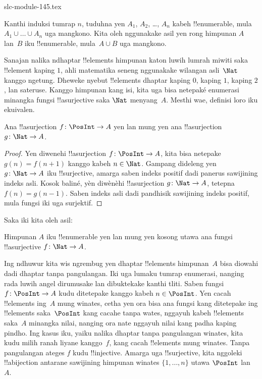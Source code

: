 \begin{filecontents*}[overwrite]{slc-module-145.tex}
\begin{prob}
  Kanthi induksi tumrap $n$, tuduhna yen $A_1$, $A_2$, \dots, $A_n$ kabeh
  !!{enumerable}, mula $A_1 \cup \dots \cup A_n$ uga mangkono. Kita oleh nggunakake
  asil yen rong himpunan $A$ lan~$B$ iku !!{enumerable}, mula~$A \cup
  B$ uga mangkono.
\end{prob}

Sanajan nalika ndhaptar !!{element}s himpunan katon luwih lumrah
miwiti saka !!{element} kaping $1$, ahli matematika seneng
nggunakake wilangan asli~$\Nat$ kanggo ngetung.
Dheweke nyebut !!{element}s dhaptar kaping $0$, kaping $1$, kaping $2$, lan sateruse.
Kanggo himpunan kang isi, kita uga bisa netepaké enumerasi minangka
fungsi !!a{surjective} saka $\Nat$ menyang~$A$.
Mesthi wae, definisi loro iku ekuivalen.

\begin{prop}
  Ana !!a{surjection} $f\colon \PosInt \to A$ yen lan mung yen ana
  !!a{surjection} $g\colon \Nat \to A$.
\end{prop}

\begin{proof}
  Yen diwenehi !!a{surjection} $f\colon \PosInt \to A$, kita bisa netepake $g(n) =
  f(n+1)$ kanggo kabeh $n \in \Nat$. Gampang dideleng yen $g\colon \Nat
  \to A$ iku !!{surjective}, amarga saben indeks positif dadi panerus
  sawijining indeks asli. Kosok baliné, yèn diwènèhi !!a{surjection} $g\colon
  \Nat \to A$, tetepna $f(n) = g(n-1)$. Saben indeks asli dadi
  pandhisik sawijining indeks positif, mula fungsi iki uga surjektif.
\end{proof}

Saka iki kita oleh asil:

\begin{cor}
Himpunan $A$ iku !!{enumerable} yen lan mung yen kosong utawa ana
fungsi !!a{surjective} $f\colon \Nat \to A$.
\end{cor}

Ing ndhuwur kita wis ngrembug yen dhaptar !!{element}s himpunan~$A$ bisa
diowahi dadi dhaptar tanpa pangulangan. Iki uga lumaku tumrap
enumerasi, nanging rada luwih angel dirumusake lan dibuktekake kanthi tliti.
Saben fungsi $f\colon \PosInt \to A$ kudu ditetepake kanggo kabeh $n \in
\PosInt$. Yen cacah !!{element}s ing~$A$ mung winates, cetha yen ora bisa
ana fungsi kang ditetepake ing !!{element}s saka~$\PosInt$ kang cacahe tanpa wates,
nggayuh kabeh !!{element}s saka~$A$ minangka nilai, nanging ora nate
nggayuh nilai kang padha kaping pindho. Ing kasus iku, yaiku
nalika dhaptar tanpa pangulangan winates, kita kudu milih ranah
liyane kanggo~$f$, kang cacah !!{element}s mung winates.
Tanpa pangulangan ateges $f$ kudu !!{injective}. Amarga uga
!!{surjective}, kita nggoleki !!a{bijection} antarane sawijining
himpunan winates $\{1, \dots, n\}$ utawa $\PosInt$ lan~$A$.


\end{filecontents*}
